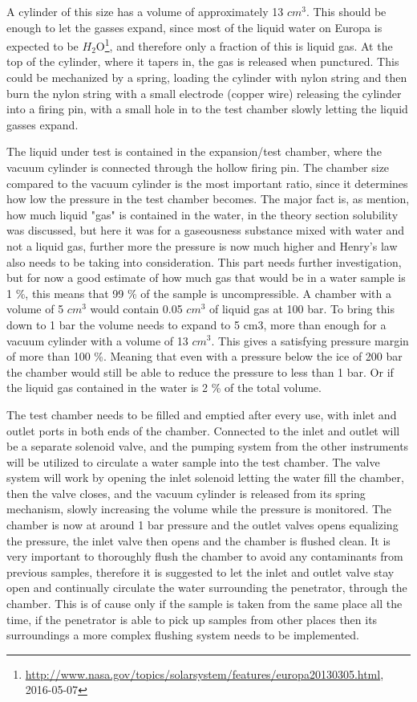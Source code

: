 A cylinder of this size has a volume of approximately 13 $cm^3$. This should be enough to let the gasses expand, since most of the liquid water on Europa is expected to be $H_2$O\footnote{\url{http://www.nasa.gov/topics/solarsystem/features/europa20130305.html}, 2016-05-07}, and therefore only a fraction of this is liquid gas. At the top of the cylinder, where it tapers in, the gas is released when punctured. This could be mechanized by a spring, loading the cylinder with nylon string and then burn the nylon string with a small electrode (copper wire) releasing the cylinder into a firing pin, with a small hole in to the test chamber slowly letting the liquid gasses expand.

The liquid under test is contained in the expansion/test chamber, where the vacuum cylinder is connected through the hollow firing pin. The chamber size compared to the vacuum cylinder is the most important ratio, since it determines how low the pressure in the test chamber becomes. The major fact is, as mention, how much liquid "gas" is contained in the water, in the theory section solubility was discussed, but here it was for a gaseousness substance mixed with water and not a liquid gas, further more the pressure is now much higher and Henry's law also needs to be taking into consideration. This part needs further investigation, but for now a good estimate of how much gas that would be in a water sample is 1 \%, this means that 99 \% of the sample is uncompressible. A chamber with a volume of 5 $cm^3$ would contain 0.05 $cm^3$ of liquid gas at 100 bar. To bring this down to 1 bar the volume needs to expand to 5 cm3, more than enough for a vacuum cylinder with a volume of 13 $cm^3$. This gives a satisfying pressure margin of more than 100 \%. Meaning that even with a pressure below the ice of 200 bar the chamber would still be able to reduce the pressure to less than 1 bar. Or if the liquid gas contained in the water is 2 \% of the total volume.

The test chamber needs to be filled and emptied after every use, with inlet and outlet ports in both ends of the chamber. Connected to the inlet and outlet will be a separate solenoid valve, and the pumping system from the other instruments will be utilized to circulate a water sample into the test chamber. The valve system will work by opening the inlet solenoid letting the water fill the chamber, then the valve closes, and the vacuum cylinder is released from its spring mechanism, slowly increasing the volume while the pressure is monitored. The chamber is now at around 1 bar pressure and the outlet valves opens equalizing the pressure, the inlet valve then opens and the chamber is flushed clean. It is very important to thoroughly flush the chamber to avoid any contaminants from previous samples, therefore it is suggested to let the inlet and outlet valve stay open and continually circulate the water surrounding the penetrator, through the chamber. This is of cause only if the sample is taken from the same place all the time, if the penetrator is able to pick up samples from other places then its surroundings a more complex flushing system needs to be implemented.

